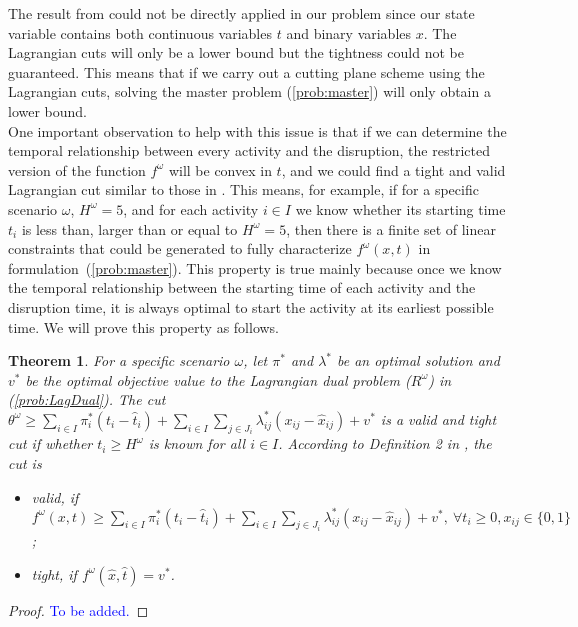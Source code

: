 \documentclass[11pt]{article}
\newtheorem{theorem}{Theorem}
\begin{document}
	The result from \cite{zou2016nested} could not be directly applied in our problem since our state variable contains both continuous variables \(t\) and binary variables \(x\). The Lagrangian cuts will only be a lower bound but the tightness could not be guaranteed. This means that if we carry out a cutting plane scheme using the Lagrangian cuts, solving the master problem (\ref{prob:master}) will only obtain a lower bound. \\
	\newline
	One important observation to help with this issue is that if we can determine the temporal relationship between every activity and the disruption, the restricted version of the function \(f^\omega\) will be convex in \(t\), and we could find a tight and valid Lagrangian cut similar to those in \cite{zou2016nested}. This means, for example, if for a specific scenario \(\omega\), \(H^\omega = 5\), and for each activity \(i \in I\) we know whether its starting time \(t_i\) is less than, larger than or equal to \(H^\omega = 5\), then there is a finite set of linear constraints that could be generated to fully characterize \(f^\omega(x,t)\) in formulation~(\ref{prob:master}). This property is true mainly because once we know the temporal relationship between the starting time of each activity and the disruption time, it is always optimal to start the activity at its earliest possible time. We will prove this property as follows. 
	\begin{theorem}
		For a specific scenario \(\omega\), let \(\pi^*\) and \(\lambda^*\) be an optimal solution and \(v^*\) be the optimal objective value to the Lagrangian dual problem (\(R^\omega\)) in (\ref{prob:LagDual}). The cut \(\theta^\omega \geq \sum_{i \in I} \pi_i^* (t_i - \hat{t}_i) + \sum_{i \in I} \sum_{j \in J_i} \lambda_{ij}^* (x_{ij} - \hat{x}_{ij}) + v^*\) is a valid and tight cut if whether \(t_i \geq H^\omega\) is known for all \(i \in I\). According to Definition 2 in \cite{zou2016nested}, the cut is
		\begin{itemize}
			\item valid, if \(f^\omega(x,t) \geq \sum_{i \in I} \pi_i^* (t_i - \hat{t}_i) + \sum_{i \in I} \sum_{j \in J_i} \lambda_{ij}^* (x_{ij} - \hat{x}_{ij}) + v^*,\ \forall t_i \geq 0, x_{ij} \in \{0,1\}\);
			\item tight, if \(f^\omega(\hat{x},\hat{t}) = v^*\).
		\end{itemize} 
	\end{theorem}
	\begin{proof}
		\textcolor{blue}{To be added.}
	\end{proof}
\end{document}
